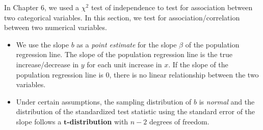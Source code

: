 \noindent In Chapter 6, we used a $\chi^2$ test of independence to test for association between two categorical variables.  In this section, we test for association/correlation between two numerical variables.
\begin{itemize}
\item We use the slope $b$ as a \emph{point estimate} for the slope $\beta$ of the population regression line.  The slope of the population regression line is the true increase/decrease in $y$ for each unit increase in $x$.  If the slope of the population regression line is 0, there is no linear relationship between the two variables.  
\item Under certain assumptions, the sampling distribution of $b$ is \emph{normal} and the distribution of the standardized test statistic using the standard error of the slope follows a $\pmb{t}$\textbf{-distribution} with $n-2$ degrees of freedom.


\end{itemize}
